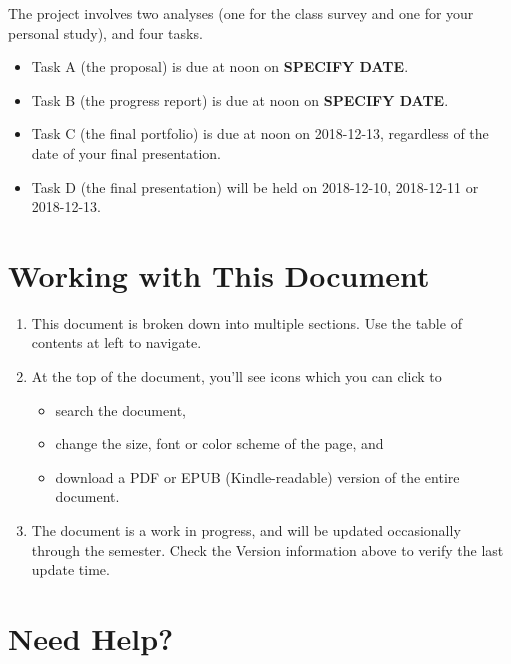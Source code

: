 \documentclass[]{book}
\providecommand{\tightlist}{%
  \setlength{\itemsep}{0pt}\setlength{\parskip}{0pt}}
\theoremstyle{definition}
\theoremstyle{definition}
\theoremstyle{definition}
\theoremstyle{remark}
\begin{document}
The project involves two analyses (one for the class survey and one for
your personal study), and four tasks.

\begin{itemize}
\tightlist
\item
  Task A (the proposal) is due at noon on \textbf{SPECIFY DATE}.
\item
  Task B (the progress report) is due at noon on \textbf{SPECIFY DATE}.
\item
  Task C (the final portfolio) is due at noon on 2018-12-13, regardless
  of the date of your final presentation.
\item
  Task D (the final presentation) will be held on 2018-12-10, 2018-12-11
  or 2018-12-13.
\end{itemize}

\hypertarget{working-with-this-document}{%
\section*{Working with This Document}\label{working-with-this-document}}

\begin{enumerate}
\def\labelenumi{\arabic{enumi}.}
\tightlist
\item
  This document is broken down into multiple sections. Use the table of
  contents at left to navigate.
\item
  At the top of the document, you'll see icons which you can click to

  \begin{itemize}
  \tightlist
  \item
    search the document,
  \item
    change the size, font or color scheme of the page, and
  \item
    download a PDF or EPUB (Kindle-readable) version of the entire
    document.
  \end{itemize}
\item
  The document is a work in progress, and will be updated occasionally
  through the semester. Check the Version information above to verify
  the last update time.
\end{enumerate}

\hypertarget{need-help}{%
\section*{Need Help?}\label{need-help}}
\end{document}

